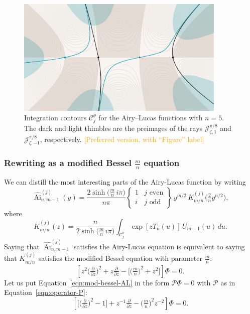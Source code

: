 \documentclass{article}
\DeclareMathOperator{\Ai}{Ai}
\theoremstyle{definition}
\theoremstyle{plain}
\begin{document}
\begin{figure}[ht]
    \centering
   \includegraphics[width=10cm]{figures/thimbles-n5.png}
    \caption{Integration contours $\mathcal{C}^\theta_j$ for the Airy--Lucas functions with $n=5$. The dark and light thimbles are the preimages of the rays $\mathcal{J}^{\pi/8}_{\zeta, 1}$ and $\mathcal{J}^{\pi/8}_{\zeta, -1}$, respectively. \textcolor{orange}{[Preferred version, with ``Figure'' label]}}
    \label{fig:thimble_n_5}
\end{figure}


\subsubsection{Rewriting as a modified Bessel $\frac{m}{n}$ equation}
We can distill the most interesting parts of the Airy-Lucas function by writing
\[ \widehat{\Ai}^{(j)}_{n, m-1}(y) = \frac{2 \sinh\big(\tfrac{m}{n}\,i\pi\big)}{n\pi} \left\{\begin{array}{ll}1 & j \text{ even} \\ i & j \text{ odd}\end{array}\right\}\,y^{{m/2}}\,K^{(j)}_{m/n}\big(\tfrac{2}{n} y^{n/2}\big), \]
where
\begin{equation}\label{integral:mod-bessel-rational-AL}
K^{(j)}_{m/n}(z) = \frac{n}{2 \sinh\big(\tfrac{m}{n}\,i\pi\big)}\int_{\mathcal{C}^\theta_j} \exp\left[z T_n(u)\right]\,U_{m-1}(u)\,du.
\end{equation}
Saying that $\widehat{\Ai}^{(j)}_{n, m-1}$ satisfies the Airy-Lucas equation is equivalent to saying that $K^{(j)}_{m/n}$ satisfies the modified Bessel equation with parameter $\frac{m}{n}$:
\begin{equation}\label{eqn:mod-bessel-AL}
\left[z^2 \big(\tfrac{\partial}{\partial z}\big)^2 + z \tfrac{\partial}{\partial z} - \big[\big(\tfrac{m}{n} \big)^2 + z^2\big]\right] \Phi = 0.
\end{equation}
Let us put Equation~\eqref{eqn:mod-bessel-AL} in the form $\mathcal{P}\Phi=0$ with $\mathcal{P}$ as in Equation~\eqref{eqn:operator-P}:
\begin{equation}\label{eqn:reg-mod-bessel-AL}
\left[ \big[ \big(\tfrac{\partial}{\partial z}\big)^2 - 1 \big] + z^{-1} \tfrac{\partial}{\partial z} - \big({\tfrac{m}{n}}\big)^2 z^{-2} \right] \Phi = 0.
\end{equation}
\end{document}
